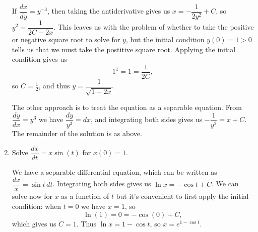 \documentclass[12pt]{article}
\begin{document}
\begin{enumerate}
If $\dfrac{dx}{dy} = y^{-3}$, then taking the antiderivative gives us $x = -\dfrac{1}{2y^2}+C$, so $y^2=\dfrac{1}{2C-2x}$. This leaves us with the problem of whether to take the positive or negative square root to solve for $y$, but the initial condition $y(0)=1>0$ tells us that we must take the postitive square root. Applying the initial condition gives us
\[
 1^1 = 1 = \frac{1}{2C},
\]
so $C=\frac{1}{2}$, and thus $y=\dfrac{1}{\sqrt{1-2x}}$.

The other approach is to treat the equation as a separable equation. From $\dfrac{dy}{dx}=y^3$ we have $\dfrac{dy}{y^3}=dx$, and integrating both sides gives us $-\dfrac{1}{y^2} = x+C$. The remainder of the solution is as above.

 \item Solve $\dfrac{dx}{dt} = x\sin(t)$ for $x(0)=1$.

\bigskip

We have a separable differential equation, which can be written as $\dfrac{dx}{x} = \sin t\,dt$. Integrating both sides gives us $\ln x = -\cos t+C$. We can solve now for $x$ as a function of $t$ but it's convenient to first apply the initial condition: when $t=0$ we have $x=1$, so
\[
 \ln (1) = 0 = -\cos(0)+C,
\]
which gives us $C=1$. Thus $\ln x = 1-\cos t$, so $x = e^{1-\cos t}$.
\end{enumerate}
\end{document}
